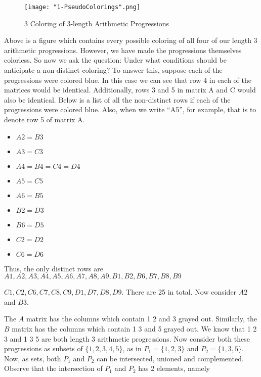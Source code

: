 \documentclass[12pt, a4paper]{article}
\begin{document}
\newpage

\begin{figure}
    \begin{flushleft}
    \texttt{[image: "1-PseudoColorings".png]}
    \caption{3 Coloring of 3-length Arithmetic Progressions}
    \label{fig:my_label}
    \end{flushleft}
\end{figure}

Above is a figure which contains every possible coloring of all four of our length 3 arithmetic progressions. However, we have made the progressions themselves colorless. So now we ask the question: Under what conditions should be anticipate a non-distinct coloring? To answer this, suppose each of the progressions were colored blue. In this case we can see that row 4 in each of the matrices would be identical. Additionally, rows 3 and 5 in matrix A and C would also be identical. Below is a list of all the non-distinct rows if each of the progressions were colored blue. Also, when we write ``A5'', for example, that is to denote row 5 of matrix A.

\begin{itemize}
    \item $A2=B3$
    \item $A3=C3$
    \item $A4=B4=C4=D4$
    \item $A5=C5$
    \item $A6=B5$
    \item $B2=D3$
    \item $B6=D5$
    \item $C2=D2$
    \item $C6=D6$
\end{itemize}

\noindent Thus, the only distinct rows are $A1, A2, A3, A4, A5, A6, A7, A8, A9, B1, B2, B6, B7, B8, B9$\par \noindent$C1, C2, C6, C7, C8, C9, D1, D7, D8, D9$. There are 25 in total. Now consider $A2$ and $B3$.

\newpage

The $A$ matrix has the columns which contain 1 2 and 3 grayed out. Similarly, the $B$ matrix has the columns which contain 1 3 and 5 grayed out. We know that 1 2 3 and 1 3 5 are both length 3 arithmetic progressions. Now consider both these progressions as subsets of $\{1, 2, 3, 4, 5\}$, as in $P_1=\{1, 2, 3\}$ and $P_2=\{1, 3, 5\}$. Now, as sets, both $P_1$ and $P_2$ can be intersected, unioned and complemented. Observe that the intersection of $P_1$ and $P_2$ has 2 elements, namely
\end{document}

